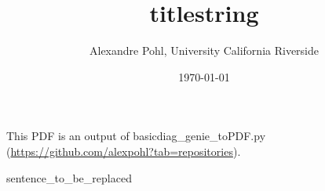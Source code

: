 \documentclass[a4paper,12pt]{scrartcl}
\begin{document}
\title{titlestring}
\author{Alexandre Pohl, University California Riverside}
\date{\today}
\maketitle

\listoffigures

\clearpage

This PDF is an output of basicdiag_genie_toPDF.py (\url{https://github.com/alexpohl?tab=repositories}). \\ 



\begin{flushleft}
sentence_to_be_replaced
\end{flushleft}

\clearpage

\end{document}
